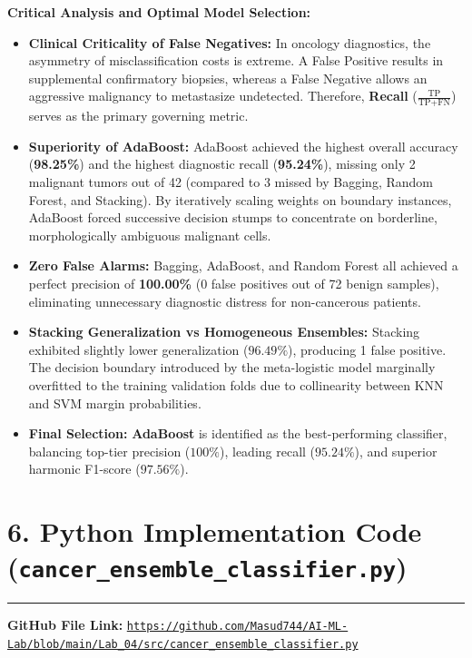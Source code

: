 \documentclass[11pt,a4paper]{article}
\begin{document}
\vspace{0.1cm}
\noindent\textbf{Critical Analysis and Optimal Model Selection:}
\begin{itemize}[noitemsep,topsep=1pt,leftmargin=*]
    \item \textbf{Clinical Criticality of False Negatives:} In oncology diagnostics, the asymmetry of misclassification costs is extreme. A False Positive results in supplemental confirmatory biopsies, whereas a False Negative allows an aggressive malignancy to metastasize undetected. Therefore, \textbf{Recall} ($\frac{\text{TP}}{\text{TP} + \text{FN}}$) serves as the primary governing metric.
    \item \textbf{Superiority of AdaBoost:} AdaBoost achieved the highest overall accuracy (\textbf{98.25\%}) and the highest diagnostic recall (\textbf{95.24\%}), missing only 2 malignant tumors out of 42 (compared to 3 missed by Bagging, Random Forest, and Stacking). By iteratively scaling weights on boundary instances, AdaBoost forced successive decision stumps to concentrate on borderline, morphologically ambiguous malignant cells.
    \item \textbf{Zero False Alarms:} Bagging, AdaBoost, and Random Forest all achieved a perfect precision of \textbf{100.00\%} (0 false positives out of 72 benign samples), eliminating unnecessary diagnostic distress for non-cancerous patients.
    \item \textbf{Stacking Generalization vs Homogeneous Ensembles:} Stacking exhibited slightly lower generalization ($96.49\%$), producing 1 false positive. The decision boundary introduced by the meta-logistic model marginally overfitted to the training validation folds due to collinearity between KNN and SVM margin probabilities.
    \item \textbf{Final Selection:} \textbf{AdaBoost} is identified as the best-performing classifier, balancing top-tier precision ($100\%$), leading recall ($95.24\%$), and superior harmonic F1-score ($97.56\%$).
\end{itemize}

\newpage

\section*{6. Python Implementation Code (\texttt{cancer\_ensemble\_classifier.py})}
\noindent\rule{\textwidth}{0.5pt}\vspace{0.1cm}

\noindent\textbf{GitHub File Link: }
\href{https://github.com/Masud744/AI-ML-Lab/blob/main/Lab_04/src/cancer_ensemble_classifier.py}{\texttt{https://github.com/Masud744/AI-ML-Lab/blob/main/Lab\_04/src/cancer\_ensemble\_classifier.py}}\vspace{0.15cm}


\end{document}
